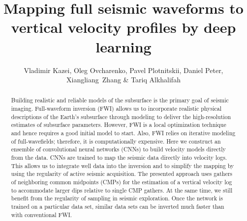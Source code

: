 \documentclass[paper,twocolomn]{geophysics}
\begin{document}
\title{Mapping full seismic waveforms to vertical velocity profiles by deep learning}

\renewcommand{\thefootnote}{\fnsymbol{footnote}} 

\author{Vladimir Kazei, Oleg Ovcharenko, Pavel Plotnitskii, Daniel Peter, Xiangliang~Zhang \& Tariq Alkhalifah}
\address{
King Abdullah University of Science and Technology (KAUST), Thuwal, 23955-6900, Saudi Arabia \\
vladimir.kazei@kaust.edu.sa, oleg.ovcharenko@kaust.edu.sa, pavel.plotnitskii@kaust.edu.sa, \\
daniel.peter@kaust.edu.sa, xiangliang.zhang@kaust.edu.sa, tariq.alkhalifah@kaust.edu.sa}



\maketitle

\begin{abstract}
	Building realistic and reliable models of the subsurface is the primary goal of seismic imaging.
	Full-waveform inversion (FWI) allows us to incorporate realistic physical descriptions of the Earth’s subsurface through modeling to deliver the high-resolution estimates of subsurface parameters.
	However, FWI is a local optimization technique and hence requires a good initial model to start. Also, FWI relies on iterative modeling of full-wavefields; therefore, it is computationally expensive.
	Here we construct an ensemble of convolutional neural networks (CNNs) to build velocity models directly from the data.
	CNNs are trained to map the seismic data directly into velocity logs. This allows us to integrate well data into the inversion and to simplify the mapping by using the regularity of active seismic acquisition. 
	The presented approach uses gathers of neighboring common midpoints (CMPs) for the estimation of a vertical velocity log to accommodate larger dips relative to single CMP gathers. At the same time, we still benefit from the regularity of sampling in seismic exploration. 
	Once the network is trained on a particular data set, similar data sets can be inverted much faster than with conventional FWI.
\end{abstract}

\end{document}

